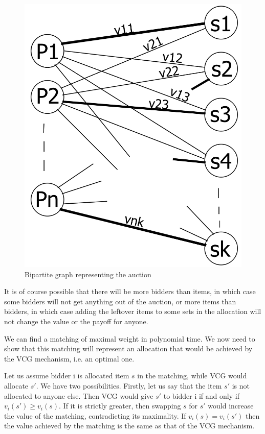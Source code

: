 \documentclass[11pt,journal]{article}
\begin{document}
	\begin{figure}[h]
		\centering
		\includegraphics[scale=0.7]{matching.png}
		\caption{Bipartite graph representing the auction}
	\end{figure}
	
	It is of course possible that there will be more bidders than items, in which case some bidders will not get anything out of the auction, or more items than bidders, in which case adding the leftover items to some sets in the allocation will not change the value or the payoff for anyone.

	We can find a matching of maximal weight in polynomial time. We now need to show that this matching will represent an allocation that would be achieved by the VCG mechanism, i.e. an optimal one.
	
	Let us assume bidder i is allocated item $s$ in the matching, while VCG would allocate $s'$. We have two possibilities. Firstly, let us say that the item $s'$ is not allocated to anyone else. Then VCG would give $s'$ to bidder i if and only if $v_i(s') \geq v_i(s)$. If it is strictly greater, then swapping $s$ for $s'$ would increase the value of the matching, contradicting its maximality. If $v_i(s) = v_i(s')$ then the value achieved by the matching is the same as that of the VCG mechanism.
	
\end{document}
